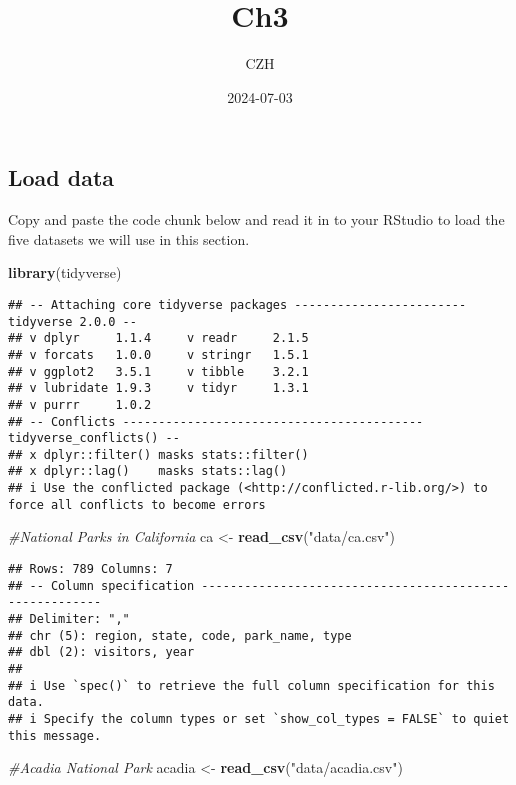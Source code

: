 \documentclass[
]{article}
\title{Ch3}
\author{CZH}
\date{2024-07-03}
\newenvironment{Shaded}{\begin{snugshade}}{\end{snugshade}}
\newcommand{\CommentTok}[1]{\textcolor[rgb]{0.56,0.35,0.01}{\textit{#1}}}
\newcommand{\FunctionTok}[1]{\textcolor[rgb]{0.13,0.29,0.53}{\textbf{#1}}}
\newcommand{\NormalTok}[1]{#1}
\newcommand{\OtherTok}[1]{\textcolor[rgb]{0.56,0.35,0.01}{#1}}
\newcommand{\StringTok}[1]{\textcolor[rgb]{0.31,0.60,0.02}{#1}}
\begin{document}
\maketitle

\subsection{Load data}\label{load-data}

Copy and paste the code chunk below and read it in to your RStudio to
load the five datasets we will use in this section.

\begin{Shaded}
\begin{Highlighting}[]
\FunctionTok{library}\NormalTok{(tidyverse)}
\end{Highlighting}
\end{Shaded}

\begin{verbatim}
## -- Attaching core tidyverse packages ------------------------ tidyverse 2.0.0 --
## v dplyr     1.1.4     v readr     2.1.5
## v forcats   1.0.0     v stringr   1.5.1
## v ggplot2   3.5.1     v tibble    3.2.1
## v lubridate 1.9.3     v tidyr     1.3.1
## v purrr     1.0.2     
## -- Conflicts ------------------------------------------ tidyverse_conflicts() --
## x dplyr::filter() masks stats::filter()
## x dplyr::lag()    masks stats::lag()
## i Use the conflicted package (<http://conflicted.r-lib.org/>) to force all conflicts to become errors
\end{verbatim}

\begin{Shaded}
\begin{Highlighting}[]
 \CommentTok{\#National Parks in California}
\NormalTok{ ca }\OtherTok{\textless{}{-}} \FunctionTok{read\_csv}\NormalTok{(}\StringTok{"data/ca.csv"}\NormalTok{) }
\end{Highlighting}
\end{Shaded}

\begin{verbatim}
## Rows: 789 Columns: 7
## -- Column specification --------------------------------------------------------
## Delimiter: ","
## chr (5): region, state, code, park_name, type
## dbl (2): visitors, year
## 
## i Use `spec()` to retrieve the full column specification for this data.
## i Specify the column types or set `show_col_types = FALSE` to quiet this message.
\end{verbatim}

\begin{Shaded}
\begin{Highlighting}[]
 \CommentTok{\#Acadia National Park}
\NormalTok{ acadia }\OtherTok{\textless{}{-}} \FunctionTok{read\_csv}\NormalTok{(}\StringTok{"data/acadia.csv"}\NormalTok{)}
\end{Highlighting}
\end{Shaded}
\end{document}
